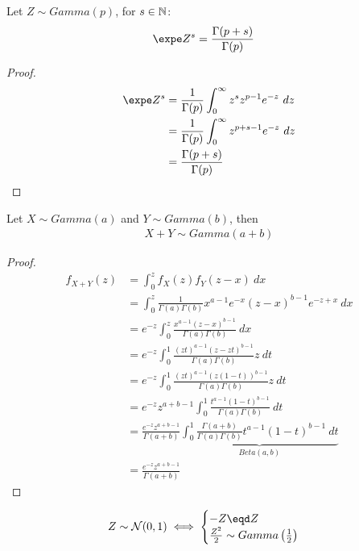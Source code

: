 \documentclass{article}
\begin{document}
   	\begin{theorem}
   		Let $Z \sim Gamma(p)$, for $s \in \mathbb{N}$:
   		\begin{align}
   			\expe Z^s &= \frac{\Gamma(p+s)}{\Gamma(p)}
   		\end{align}
   	\end{theorem}
   	
   	\begin{proof}
   		\begin{align}
   			\expe Z^s &= \frac{1}{\Gamma(p)}\int_0^\infty z^s z^{p-1} e^{-z}\ dz \\
   			&= \frac{1}{\Gamma(p)}\int_0^\infty z^{p+s-1} e^{-z}\ dz \\
   			&= \frac{\Gamma(p+s)}{\Gamma(p)}
   		\end{align}
   	\end{proof}
   	
   	\begin{theorem}
   		Let $X \sim Gamma(a)$ and $Y \sim Gamma(b)$, then
   		\begin{align}
   			X + Y \sim Gamma(a + b)
   		\end{align}
   	\end{theorem}
   	
   	\begin{proof}
   		\begin{align}
   			f_{X+Y}(z) &= \int_0^z f_X(z) f_Y(z-x)\ dx \\
   			&= \int_0^z \frac{1}{\Gamma(a) \Gamma(b)} x^{a-1} e^{-x} (z-x)^{b-1} e^{-z+x}\ dx \\
   			&= e^{-z} \int_0^z \frac{x^{a-1} (z-x)^{b-1}}{\Gamma(a) \Gamma(b)} \ dx \\
   			&= e^{-z} \int_0^1 \frac{(zt)^{a-1} (z - zt)^{b-1}}{\Gamma(a) \Gamma(b)} z\ dt \\
   			&= e^{-z} \int_0^1 \frac{(zt)^{a-1} (z(1 - t))^{b-1}}{\Gamma(a) \Gamma(b)} z\ dt \\
   			&= e^{-z} z^{a+b-1} \int_0^1 \frac{t^{a-1} (1 - t)^{b-1}}{\Gamma(a) \Gamma(b)}\ dt \\
   			&= \frac{e^{-z} z^{a+b-1}}{\Gamma(a+b)} \underbrace{\int_0^1 \frac{\Gamma(a+b)}{\Gamma(a) \Gamma(b)} t^{a-1} (1 - t)^{b-1} \ dt}_{Beta(a, b)} \\
   			&= \frac{e^{-z} z^{a+b-1}}{\Gamma(a+b)} 
   		\end{align}
   	\end{proof}
   	
   	\begin{theorem}
   		\begin{align}
   			Z \sim \mc{N}(0, 1) \iff \begin{cases}
   				- Z \eqd Z \\
   				\frac{Z^2}{2} \sim Gamma \left(\frac{1}{2}\right)
   			\end{cases}
   		\end{align}
   	\end{theorem}
   	
\end{document}
